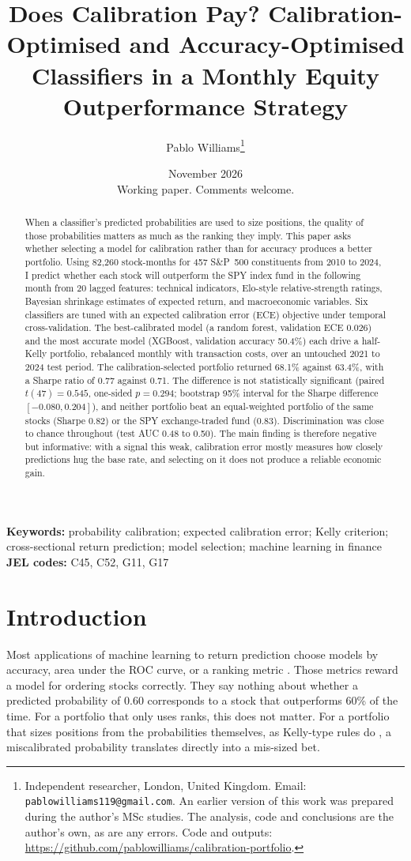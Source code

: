 \documentclass[11pt,a4paper]{article}
\title{Does Calibration Pay? Calibration-Optimised and Accuracy-Optimised Classifiers in a Monthly Equity Outperformance Strategy}
\author{Pablo Williams\thanks{Independent researcher, London, United Kingdom. Email: \texttt{pablowilliams119@gmail.com}. An earlier version of this work was prepared during the author's MSc studies. The analysis, code and conclusions are the author's own, as are any errors. Code and outputs: \url{https://github.com/pablowilliams/calibration-portfolio}.}}
\date{November 2026\\[0.3em]\small Working paper. Comments welcome.}
\begin{document}
\maketitle

\begin{abstract}
\noindent
When a classifier's predicted probabilities are used to size positions, the quality of those probabilities matters as much as the ranking they imply. This paper asks whether selecting a model for calibration rather than for accuracy produces a better portfolio. Using 82{,}260 stock-months for 457 S\&P~500 constituents from 2010 to 2024, I predict whether each stock will outperform the SPY index fund in the following month from 20 lagged features: technical indicators, Elo-style relative-strength ratings, Bayesian shrinkage estimates of expected return, and macroeconomic variables. Six classifiers are tuned with an expected calibration error (ECE) objective under temporal cross-validation. The best-calibrated model (a random forest, validation ECE 0.026) and the most accurate model (XGBoost, validation accuracy 50.4\%) each drive a half-Kelly portfolio, rebalanced monthly with transaction costs, over an untouched 2021 to 2024 test period. The calibration-selected portfolio returned 68.1\% against 63.4\%, with a Sharpe ratio of 0.77 against 0.71. The difference is not statistically significant (paired $t(47)=0.545$, one-sided $p=0.294$; bootstrap 95\% interval for the Sharpe difference $[-0.080, 0.204]$), and neither portfolio beat an equal-weighted portfolio of the same stocks (Sharpe 0.82) or the SPY exchange-traded fund (0.83). Discrimination was close to chance throughout (test AUC 0.48 to 0.50). The main finding is therefore negative but informative: with a signal this weak, calibration error mostly measures how closely predictions hug the base rate, and selecting on it does not produce a reliable economic gain.
\end{abstract}

\noindent\textbf{Keywords:} probability calibration; expected calibration error; Kelly criterion; cross-sectional return prediction; model selection; machine learning in finance\\
\textbf{JEL codes:} C45, C52, G11, G17

\section{Introduction}

Most applications of machine learning to return prediction choose models by accuracy, area under the ROC curve, or a ranking metric \citep{gu2020}. Those metrics reward a model for ordering stocks correctly. They say nothing about whether a predicted probability of 0.60 corresponds to a stock that outperforms 60\% of the time. For a portfolio that only uses ranks, this does not matter. For a portfolio that sizes positions from the probabilities themselves, as Kelly-type rules do \citep{kelly1956,thorp2006}, a miscalibrated probability translates directly into a mis-sized bet.
\end{document}
